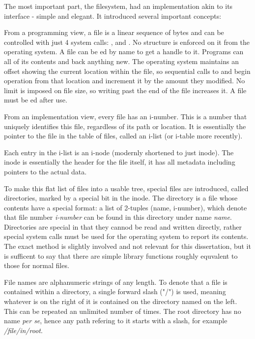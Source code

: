         The most important part, the filesystem, had an implementation akin to
        its interface - simple and elegant. It introduced several important
        concepts:

        From a programming view, a file is a linear sequence of bytes and can
        be controlled with just 4 system calls:  ,
         and . No structure is enforced on it
        from the operating system. A file can be ed by name to
        get a handle to it. Programs can  all of its contents and
         back anything new. The operating system maintains an
        offset showing the current location within the file, so sequential
        calls to  and  begin operation from that
        location and increment it by the amount they modified. No limit is
        imposed on file size, so writing past the end of the file increases it.
        A file must be ed after use.

        From an implementation view, every file has an i-number. This is a
        number that uniquely identifies this file, regardless of its path or
        location. It is essentially the pointer to the file in the table of
        files, called an i-list (or i-table more recently).

        Each entry in the i-list is an i-node (modernly shortened to just
        inode). The inode is essentially the header for the file itself, it has
        all metadata including pointers to the actual data.

        To make this flat list of files into a usable tree, special files are
        introduced, called directories, marked by a special bit in the inode.
        The directory is a file whose contents have a special format: a list of
        2-tuples (name, i-number), which denote that file number
        \textit{i-number} can be found in this directory under name
        \textit{name}. Directories are special in that they cannod be read and
        written directly, rather special system calls must be used for the
        operating system to report its contents. The exact method is slightly
        involved and not relevant for this dissertation, but it is sufficent to
        say that there are simple library functions roughly equvalent to those
        for normal files.

        File names are alphanumeric strings of any length. To denote that a
        file is contained within a directory, a single forward slash ("/") is
        used, meaning whatever is on the right of it is contained on the
        directory named on the left. This can be repeated an unlimited number
        of times. The root directory has no name \textit{per se}, hence any
        path refering to it starts with a slash, for example
        \textit{/file/in/root}.

